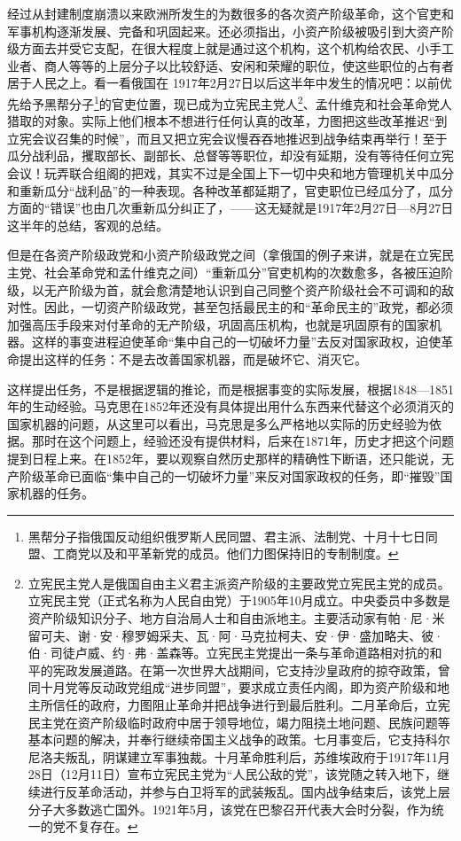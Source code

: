 \documentclass[UTF8, 12pt, a4paper]{ctexrep}
\begin{document}
经过从封建制度崩溃以来欧洲所发生的为数很多的各次资产阶级革命，这个官吏和军事机构逐渐发展、完备和巩固起来。还必须指出，小资产阶级被吸引到大资产阶级方面去并受它支配，在很大程度上就是通过这个机构，这个机构给农民、小手工业者、商人等等的上层分子以比较舒适、安闲和荣耀的职位，使这些职位的占有者居于人民之上。看一看俄国在 1917年2月27日以后这半年中发生的情况吧：以前优先给予黑帮分子\footnote{黑帮分子指俄国反动组织俄罗斯人民同盟、君主派、法制党、十月十七日同盟、工商党以及和平革新党的成员。他们力图保持旧的专制制度。}的官吏位置，现已成为立宪民主党人\footnote{立宪民主党人是俄国自由主义君主派资产阶级的主要政党立宪民主党的成员。立宪民主党（正式名称为人民自由党）于1905年10月成立。中央委员中多数是资产阶级知识分子、地方自治局人士和自由派地主。主要活动家有帕·尼·米留可夫、谢·安·穆罗姆采夫、瓦·阿·马克拉柯夫、安·伊·盛加略夫、彼·伯·司徒卢威、约·弗·盖森等。立宪民主党提出一条与革命道路相对抗的和平的宪政发展道路。在第一次世界大战期间，它支持沙皇政府的掠夺政策，曾同十月党等反动政党组成“进步同盟”，要求成立责任内阁，即为资产阶级和地主所信任的政府，力图阻止革命并把战争进行到最后胜利。二月革命后，立宪民主党在资产阶级临时政府中居于领导地位，竭力阻挠土地问题、民族问题等基本问题的解决，并奉行继续帝国主义战争的政策。七月事变后，它支持科尔尼洛夫叛乱，阴谋建立军事独裁。十月革命胜利后，苏维埃政府于1917年11月28日（12月11日）宣布立宪民主党为“人民公敌的党”，该党随之转入地下，继续进行反革命活动，并参与白卫将军的武装叛乱。国内战争结束后，该党上层分子大多数逃亡国外。1921年5月，该党在巴黎召开代表大会时分裂，作为统一的党不复存在。}、孟什维克和社会革命党人猎取的对象。实际上他们根本不想进行任何认真的改革，力图把这些改革推迟“到立宪会议召集的时候”，而且又把立宪会议慢吞吞地推迟到战争结束再举行！至于瓜分战利品，攫取部长、副部长、总督等等职位，却没有延期，没有等待任何立宪会议！玩弄联合组阁的把戏，其实不过是全国上下一切中央和地方管理机关中瓜分和重新瓜分“战利品”的一种表现。各种改革都延期了，官吏职位已经瓜分了，瓜分方面的“错误”也由几次重新瓜分纠正了，——这无疑就是1917年2月27日—8月27日这半年的总结，客观的总结。

但是在各资产阶级政党和小资产阶级政党之间（拿俄国的例子来讲，就是在立宪民主党、社会革命党和孟什维克之间）“重新瓜分”官吏机构的次数愈多，各被压迫阶级，以无产阶级为首，就会愈清楚地认识到自己同整个资产阶级社会不可调和的敌对性。因此，一切资产阶级政党，甚至包括最民主的和“革命民主的”政党，都必须加强高压手段来对付革命的无产阶级，巩固高压机构，也就是巩固原有的国家机器。这样的事变进程迫使革命“集中自己的一切破坏力量”去反对国家政权，迫使革命提出这样的任务：不是去改善国家机器，而是破坏它、消灭它。

这样提出任务，不是根据逻辑的推论，而是根据事变的实际发展，根据1848—1851年的生动经验。马克思在1852年还没有具体提出用什么东西来代替这个必须消灭的国家机器的问题，从这里可以看出，马克思是多么严格地以实际的历史经验为依据。那时在这个问题上，经验还没有提供材料，后来在1871年，历史才把这个问题提到日程上来。在1852年，要以观察自然历史那样的精确性下断语，还只能说，无产阶级革命已面临“集中自己的一切破坏力量”来反对国家政权的任务，即“摧毁”国家机器的任务。
\end{document}
